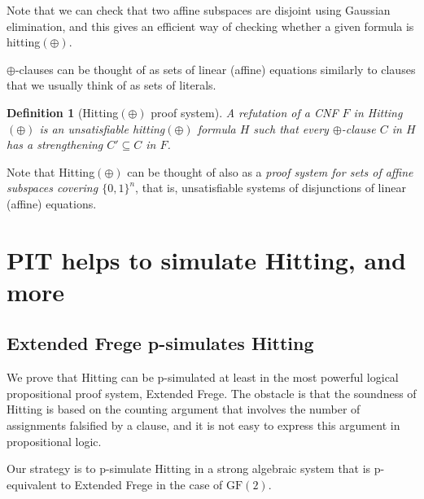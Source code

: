\documentclass[11pt]{article}
\newcommand{\scterm}[1]{{\textrm{\sc #1}}}
\newcommand{\hit}{\scterm{Hitting}}
\newcommand{\F}{\scterm{Frege}}
\newcommand{\EF}{\scterm{Extended {\F}}}
\newcommand{\hitp}{{\hit}$(\oplus)$}
\newcommand{\GF}{\mathrm{GF}}
\newcommand{\TODOJ}[1]{}%
\numberwithin{equation}{section}
\newtheorem{definition}[theorem]{Definition}
\begin{document}
Note that we can check that two affine subspaces are disjoint using Gaussian elimination, and this gives an efficient way of checking whether a given formula is hitting$(\oplus)$.

$\oplus$-clauses can be thought of as sets of linear (affine) equations similarly to
clauses that we usually think of as sets of literals.

\begin{definition}[{\hitp} proof system]\label{def:hitp}
A refutation of a CNF $F$ in {\hitp} is an unsatisfiable hitting$(\oplus)$ formula $H$
such that every $\oplus$-clause $C$ in $H$ has a strengthening $C'\subseteq C$ in $F$.
\end{definition}

Note that {\hitp} can be thought of also as a \emph{proof system
for sets of affine subspaces covering $\{0,1\}^n$}, that is, 
unsatisfiable systems of disjunctions of linear (affine) equations.

\section{PIT helps to simulate {\hit}, and more}\label{sec:verification}

\TODOJ{This section was moved from 4 to 3.}

\subsection{{\EF} p-simulates {\hit}}

We prove that {\hit} can be p-simulated at least in the most powerful logical
propositional proof system, {\EF}.
The obstacle is that the soundness of {\hit} is based on the counting argument
that involves the number of assignments falsified by a clause, and it is not easy
to express this argument in propositional logic.

Our strategy is to p-simulate {\hit} in a strong algebraic system
that is p-equivalent to {\EF} in the case of $\GF(2)$.
\end{document}
